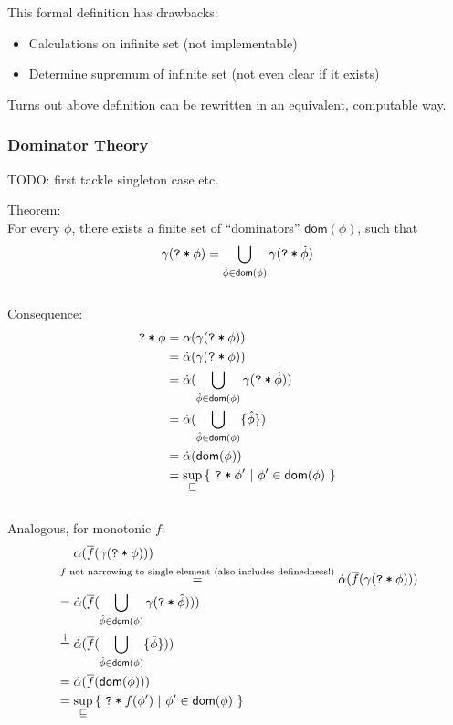 \documentclass[11pt,a4paper]{article}
\newcommand{\ttt}{\texttt}
\newcommand{\predicate}{\textsf}
\newcommand{\qm}{\ttt{?}}
\newcommand{\withqm}[1]{\ttt{\qm\:*\:$#1$}}
\newcommand{\dom}{\predicate{dom}}
\begin{document}
This formal definition has drawbacks:
\begin{itemize}
    \item Calculations on infinite set (not implementable)
    \item Determine supremum of infinite set (not even clear if it exists)
\end{itemize}

Turns out above definition can be rewritten in an equivalent, computable way.

\subsubsection{Dominator Theory}
TODO: first tackle singleton case etc.

Theorem:\\
For every $\phi$, there exists a finite set of “dominators” $\dom(\phi)$, such that 
$$\gamma(\withqm{\phi}) = \bigcup_{\hat{\phi} \in \dom(\phi)} \gamma(\withqm{\hat{\phi}})$$
~\\

Consequence: 
\begin{align*}
\withqm{\phi} 
&= \alpha(\gamma(\withqm{\phi})) \\
&= \dalpha(\gamma(\withqm{\phi})) \\
&= \dalpha(\bigcup_{\hat{\phi} \in \dom(\phi)} \gamma(\withqm{\hat{\phi}})) \\
&= \dalpha(\bigcup_{\hat{\phi} \in \dom(\phi)} \{ \hat{\phi} \}) \\
&= \dalpha(\dom(\phi)) \\
&= \sup_{\sqsubseteq} {\{~ \withqm{\phi'} ~|~ \phi' \in \dom(\phi) ~\}}
\end{align*}
~\\
Analogous, for monotonic $f$: 
\begin{align*}
&~~~~ \alpha(\overline{f}(\gamma(\withqm{\phi}))) \\
&\overset{f \text{ not narrowing to single element (also includes definedness!)}}{=} \dalpha(\overline{f}(\gamma(\withqm{\phi}))) \\
&= \dalpha(\overline{f}(\bigcup_{\hat{\phi} \in \dom(\phi)} \gamma(\withqm{\hat{\phi}}))) \\
&\overset{\dagger}{=} \dalpha(\overline{f}(\bigcup_{\hat{\phi} \in \dom(\phi)} \{ \hat{\phi} \})) \\
&= \dalpha(\overline{f}(\dom(\phi))) \\
&= \sup_{\sqsubseteq} {\{~ \withqm{f(\phi')} ~|~ \phi' \in \dom(\phi) ~\}}
\end{align*}
\end{document}
